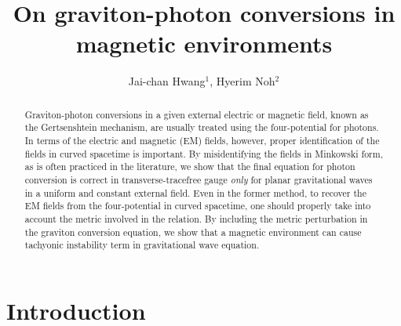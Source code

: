 \documentclass[twocolumn,amsmath,amssymb]{revtex4}
\begin{document}
\title{On graviton-photon conversions in magnetic environments}
\author{Jai-chan Hwang${}^{1}$, Hyerim Noh${}^{2}$}
\address{${}^{1}$Particle Theory  and Cosmology Group,
         Center for Theoretical Physics of the Universe,
         Institute for Basic Science (IBS), Daejeon, 34126, Republic of Korea
         \\
         ${}^{2}$Theoretical Astrophysics Group, Korea Astronomy and Space Science Institute, Daejeon, Republic of Korea
         }




\begin{abstract}

Graviton-photon conversions in a given external electric or magnetic field, known as the Gertsenshtein mechanism, are usually treated using the four-potential for photons. In terms of the electric and magnetic (EM) fields, however, proper identification of the fields in curved spacetime is important. By misidentifying the fields in Minkowski form, as is often practiced in the literature, we show that the final equation for photon conversion is correct in transverse-tracefree gauge {\it only} for planar gravitational waves in a uniform and constant external field. Even in the former method, to recover the EM fields from the four-potential in curved spacetime, one should properly take into account the metric involved in the relation. By including the metric perturbation in the graviton conversion equation, we show that a magnetic environment can cause tachyonic instability term in gravitational wave equation.

\end{abstract}


\maketitle


%
%
%
\section{Introduction}
\end{document}
